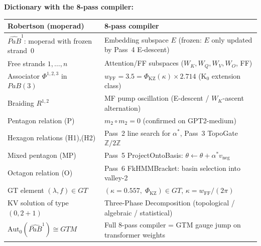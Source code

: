 \documentclass[11pt]{amsart}
\begin{document}
\textbf{Dictionary with the 8-pass compiler:}

\begin{center}\small
\begin{tabular}{p{4.5cm}p{7cm}}
\toprule
\textbf{Robertson (moperad)} & \textbf{8-pass compiler} \\
\midrule
$\widehat{PaB}^1$: moperad with frozen strand~$0$
  & Embedding subspace $E$ (frozen: $E$ only updated by Pass~4 E-descent) \\
Free strands $1,\ldots,n$
  & Attention/FF subspaces ($W_K, W_Q, W_V, W_O$, FF) \\
Associator $\Phi^{1,2,3}$ in $PaB(3)$
  & $w_\mathrm{FF} = 3.5 = \Phi_\mathrm{KZ}(\kappa)\times 2.714$
    (K$_0$ extension class) \\
Braiding $R^{1,2}$
  & MF pump oscillation (E-descent / $W_K$-ascent alternation) \\
Pentagon relation (P)
  & $m_2\circ m_2 = 0$ (confirmed on GPT2-medium) \\
Hexagon relations (H1),(H2)
  & Pass~2 line search for $\alpha^*$, Pass~3 TopoGate $\mathbb{Z}/2\mathbb{Z}$ \\
Mixed pentagon (MP)
  & Pass~5 ProjectOntoBasis: $\theta\leftarrow\theta + \alpha^* v_\mathrm{neg}$ \\
Octagon relation (O)
  & Pass~6 FkHMMBracket: basin selection into valley-2 \\
GT element $(\lambda, f)\in GT$
  & $(\kappa=0.557,\; \Phi_\mathrm{KZ})\in GT$, $\kappa = w_\mathrm{FF}/(2\pi)$ \\
KV solution of type $(0,2{+}1)$
  & Three-Phase Decomposition (topological / algebraic / statistical) \\
$\mathrm{Aut}_0(\widehat{PaB}^1)\cong GTM$
  & Full 8-pass compiler = GTM gauge jump on transformer weights \\
\bottomrule
\end{tabular}
\end{center}
\end{document}
